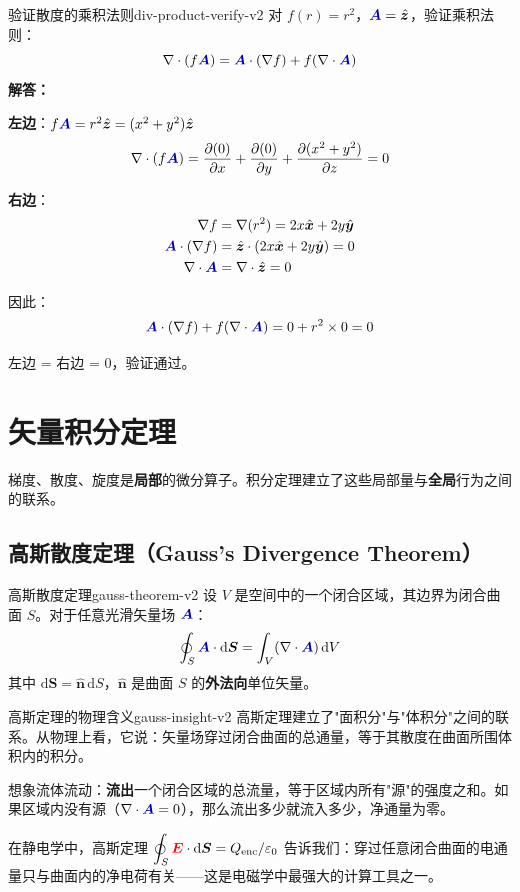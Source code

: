 \documentclass[11pt,a4paper,openany,oneside]{book}
\newcommand{\diff}{\mathrm{d}}
\newcommand{\vecE}{\textcolor{red}{\vect{E}}}
\newcommand{\vecA}{\textcolor{blue!70!black}{\vect{A}}}
\newcommand{\eps}{\varepsilon}
\newcommand{\vect}[1]{\bm{#1}}
\newcommand{\unitvec}[1]{\hat{\vect{#1}}}
\newcommand{\divg}{\nabla\cdot}
\newcommand{\difficulty}[1]{\marginnote{\textcolor{red}{\textbf{[#1]}}}}
\begin{document}
\begin{example}{验证散度的乘积法则}{div-product-verify-v2}
\difficulty{基础}
对 $f(r) = r^2$，$\vecA = \unitvec{z}$，验证乘积法则：
\[
\nabla\cdot(f\vecA) = \vecA\cdot(\nabla f) + f(\nabla\cdot\vecA)
\]
\tcblower
\textbf{解答：}

\textbf{左边}：$f\vecA = r^2\unitvec{z} = (x^2+y^2)\unitvec{z}$
\[
\nabla\cdot(f\vecA) = \frac{\partial(0)}{\partial x} + \frac{\partial(0)}{\partial y} + \frac{\partial(x^2+y^2)}{\partial z} = 0
\]

\textbf{右边}：
\begin{align*}
\nabla f &= \nabla(r^2) = 2x\unitvec{x} + 2y\unitvec{y} \\
\vecA\cdot(\nabla f) &= \unitvec{z}\cdot(2x\unitvec{x} + 2y\unitvec{y}) = 0 \\
\nabla\cdot\vecA &= \nabla\cdot\unitvec{z} = 0
\end{align*}

因此：
\[
\vecA\cdot(\nabla f) + f(\nabla\cdot\vecA) = 0 + r^2\times 0 = 0
\]

左边 = 右边 = 0，验证通过。
\end{example}
\section{矢量积分定理}

梯度、散度、旋度是\textbf{局部}的微分算子。积分定理建立了这些局部量与\textbf{全局}行为之间的联系。

\subsection{高斯散度定理（Gauss's Divergence Theorem）}

\begin{theorem}{高斯散度定理}{gauss-theorem-v2}
设 $V$ 是空间中的一个闭合区域，其边界为闭合曲面 $S$。对于任意光滑矢量场 $\vecA$：
\[
\oint_S \vecA \cdot \diff\vect{S} = \int_V (\divg\vecA) \, \diff V
\]
其中 $\diff\vect{S} = \unitvec{n} \, \diff S$，$\unitvec{n}$ 是曲面 $S$ 的\textbf{外法向}单位矢量。
\end{theorem}

\begin{insight}{高斯定理的物理含义}{gauss-insight-v2}
高斯定理建立了"面积分"与"体积分"之间的联系。从物理上看，它说：矢量场穿过闭合曲面的总通量，等于其散度在曲面所围体积内的积分。

想象流体流动：\textbf{流出}一个闭合区域的总流量，等于区域内所有"源"的强度之和。如果区域内没有源（$\divg\vecA = 0$），那么流出多少就流入多少，净通量为零。

在静电学中，高斯定理 $\displaystyle\oint_S \vecE \cdot \diff\vect{S} = Q_{\text{enc}}/\eps_0$ 告诉我们：穿过任意闭合曲面的电通量只与曲面内的净电荷有关——这是电磁学中最强大的计算工具之一。
\end{insight}
\end{document}
